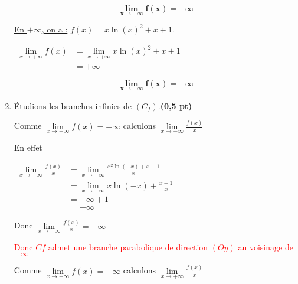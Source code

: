 \documentclass[12pt,a4paper]{article}
\begin{document}
\begin{enumerate}
          \begin{resultbox}
              \[
                  \mathbf{\lim\limits_{x\to -\infty} f(x) = +\infty }
              \]
          \end{resultbox}

          \underline{En \( +\infty \), on a :} \( f(x) = x \ln(x)^2 + x + 1. \)

          \(
          \begin{aligned}
              \lim\limits_{x\to +\infty} f(x) & = \lim\limits_{x\to +\infty}  x \ln(x)^2 + x + 1 \\
                                              & =+\infty
          \end{aligned}
          \)

          \begin{resultbox}
              \[
                  \mathbf{\lim\limits_{x\to +\infty} f(x) = +\infty }
              \]
          \end{resultbox}

    \item Étudions les branches infinies de \( (C_f) \).\hfill \textbf{(0,5 pt)}

          Comme \( \lim\limits_{x\to -\infty} f(x) = +\infty  \) calculons \( \lim\limits_{x\to -\infty} \frac{f(x)}{x}   \)

          En effet

          \(
          \begin{aligned}
              \lim\limits_{x\to -\infty} \frac{f(x)}{x} & = \lim\limits_{x\to -\infty} \frac{x^2 \ln(-x) + x + 1}{x} \\
                                                        & =\lim\limits_{x\to -\infty} x\ln(-x) + \frac{x + 1}{x}     \\
                                                        & =-\infty+1                                                 \\
                                                        & =-\infty
          \end{aligned}
          \)

          Donc \( \lim\limits_{x\to -\infty} \frac{f(x)}{x} =-\infty   \)

          \textcolor{red}{Donc \(Cf\) admet une branche parabolique de direction \((Oy)\) au voisinage de \(-\infty\)}

          Comme \( \lim\limits_{x\to +\infty} f(x) = +\infty  \) calculons \( \lim\limits_{x\to +\infty} \frac{f(x)}{x}   \)


\end{enumerate}
\end{document}
